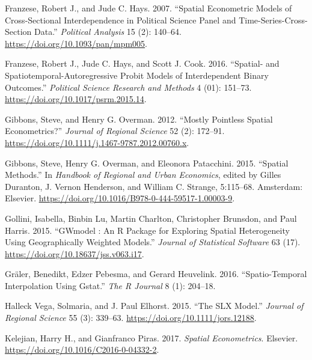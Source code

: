 \documentclass[
  letterpaper,
  DIV=11,
  numbers=noendperiod]{scrreprt}
\newlength{\cslhangindent}
\newlength{\cslentryspacingunit} %
\newenvironment{CSLReferences}[2] %
 {%
  \setlength{\parindent}{0pt}
  \ifodd #1
  \let\oldpar\par
  \def\par{\hangindent=\cslhangindent\oldpar}
  \fi
  \setlength{\parskip}{#2\cslentryspacingunit}
 }%
 {}
\begin{document}
\begin{CSLReferences}{1}{0}
\leavevmode{}%
Franzese, Robert J., and Jude C. Hays. 2007. {``Spatial {Econometric
Models} of {Cross-Sectional Interdependence} in {Political Science
Panel} and {Time-Series-Cross-Section Data}.''} \emph{Political
Analysis} 15 (2): 140--64. \url{https://doi.org/10.1093/pan/mpm005}.

\leavevmode{}%
Franzese, Robert J., Jude C. Hays, and Scott J. Cook. 2016. {``Spatial-
and {Spatiotemporal-Autoregressive Probit Models} of {Interdependent
Binary Outcomes}.''} \emph{Political Science Research and Methods} 4
(01): 151--73. \url{https://doi.org/10.1017/psrm.2015.14}.

\leavevmode{}%
Gibbons, Steve, and Henry G. Overman. 2012. {``Mostly {Pointless Spatial
Econometrics}?''} \emph{Journal of Regional Science} 52 (2): 172--91.
\url{https://doi.org/10.1111/j.1467-9787.2012.00760.x}.

\leavevmode{}%
Gibbons, Steve, Henry G. Overman, and Eleonora Patacchini. 2015.
{``Spatial {Methods}.''} In \emph{Handbook of {Regional} and {Urban
Economics}}, edited by Gilles Duranton, J. Vernon Henderson, and William
C. Strange, 5:115--68. {Amsterdam}: {Elsevier}.
\url{https://doi.org/10.1016/B978-0-444-59517-1.00003-9}.

\leavevmode{}%
Gollini, Isabella, Binbin Lu, Martin Charlton, Christopher Brunsdon, and
Paul Harris. 2015. {``{GWmodel} : {An R Package} for {Exploring Spatial
Heterogeneity Using Geographically Weighted Models}.''} \emph{Journal of
Statistical Software} 63 (17).
\url{https://doi.org/10.18637/jss.v063.i17}.

\leavevmode{}%
Gräler, Benedikt, Edzer Pebesma, and Gerard Heuvelink. 2016.
{``Spatio-{Temporal Interpolation} Using Gstat.''} \emph{The R Journal}
8 (1): 204--18.

\leavevmode{}%
Halleck Vega, Solmaria, and J. Paul Elhorst. 2015. {``The {SLX
Model}.''} \emph{Journal of Regional Science} 55 (3): 339--63.
\url{https://doi.org/10.1111/jors.12188}.

\leavevmode{}%
Kelejian, Harry H., and Gianfranco Piras. 2017. \emph{Spatial
{Econometrics}}. {Elsevier}.
\url{https://doi.org/10.1016/C2016-0-04332-2}.


\end{CSLReferences}
\end{document}
